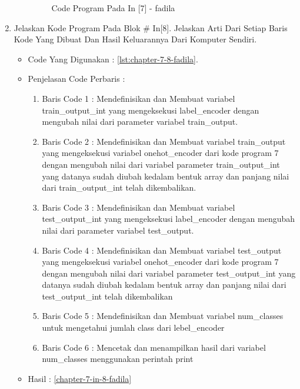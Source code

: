 \begin{enumerate}
\begin{itemize}
\begin{figure}[!hbtp]
\caption{Code Program Pada In [7] - fadila}
\label{chapter-7-in-7-fadila}
\end{figure}
\par
\par
\end{itemize}
\par
\par
\par
\item Jelaskan Kode Program Pada Blok \# In[8]. Jelaskan Arti Dari Setiap Baris Kode Yang Dibuat Dan Hasil Keluarannya Dari Komputer Sendiri.
\begin{itemize}
\item Code Yang Digunakan : \ref{lst:chapter-7-8-fadila}.

\par
\par
\item Penjelasan Code Perbaris	: 
\begin{enumerate}
\item Baris Code 1	: Mendefinisikan dan Membuat variabel train\_output\_int yang mengeksekusi label\_encoder dengan mengubah nilai dari parameter variabel train\_output.
\item Baris Code 2	: Mendefinisikan dan Membuat variabel train\_output yang mengeksekusi variabel onehot\_encoder dari kode program 7 dengan mengubah nilai dari variabel parameter train\_output\_int yang datanya sudah diubah kedalam bentuk array dan panjang nilai dari train\_output\_int telah dikembalikan.
\item Baris Code 3	: Mendefinisikan dan Membuat variabel test\_output\_int yang mengeksekusi label\_encoder dengan mengubah nilai dari parameter variabel test\_output.
\item Baris Code 4	: Mendefinisikan dan Membuat variabel test\_output yang mengeksekusi variabel onehot\_encoder dari kode program 7 dengan mengubah nilai dari variabel parameter test\_output\_int yang datanya sudah diubah kedalam bentuk array dan panjang nilai dari test\_output\_int telah dikembalikan
\item Baris Code 5	: Mendefinisikan dan Membuat variabel num\_classes untuk mengetahui jumlah class dari lebel\_encoder
\item Baris Code 6	: Mencetak dan menampilkan hasil dari variabel num\_classes menggunakan perintah print
\end{enumerate}
\item Hasil : \ref{chapter-7-in-8-fadila}

\end{itemize}
\end{enumerate}
